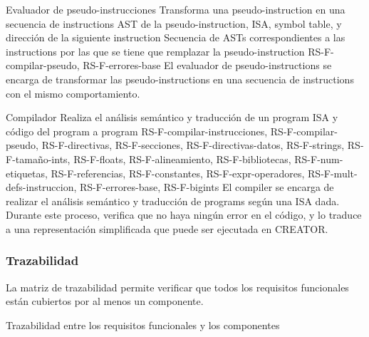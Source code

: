 \begin{component}{Evaluador de pseudo-instrucciones}
    {Transforma una \gls{pseudo-instruction} en una secuencia de \glspl{instruction}} %
    {} %
    {\gls{AST} de la \gls{pseudo-instruction}, \gls{ISA}, \gls{symbol table}, y dirección de la siguiente \gls{instruction}} %
    {Secuencia de \glspl{AST} correspondientes a las \glspl{instruction} por las que se tiene que remplazar la \gls{pseudo-instruction}} %
    {RS-F-compilar-pseudo, RS-F-errores-base} %
    El evaluador de \glspl{pseudo-instruction} se encarga de transformar las
    \glspl{pseudo-instruction} en una secuencia de \glspl{instruction} con el
    mismo comportamiento.
\end{component}

\begin{component}{Compilador}
    {Realiza el análisis semántico y traducción de un \gls{program} } %
    {} %
    {\gls{ISA} y código del \gls{program} a } %
    {\Gls{program} } %
    {RS-F-compilar-instrucciones, RS-F-compilar-pseudo, RS-F-directivas, RS-F-secciones, RS-F-directivas-datos, RS-F-strings, RS-F-tamaño-ints, RS-F-floats, RS-F-alineamiento, RS-F-bibliotecas, RS-F-num-etiquetas, RS-F-referencias, RS-F-constantes, RS-F-expr-operadores, RS-F-mult-defs-instruccion, RS-F-errores-base, RS-F-bigints} %
    El \gls{compiler} se encarga de realizar el análisis semántico y traducción
    de \glspl{program}  según una \gls{ISA} dada.
    Durante este proceso, verifica que no haya ningún error en el código, y lo
    traduce a una representación simplificada que puede ser ejecutada en
    CREATOR.
\end{component}

\FloatBarrier

\subsubsection{Trazabilidad}

La matriz de trazabilidad permite verificar que todos los requisitos funcionales
están cubiertos por al menos un componente.

\begin{landscape}
        {Trazabilidad entre los requisitos funcionales y los componentes}
\end{landscape}

